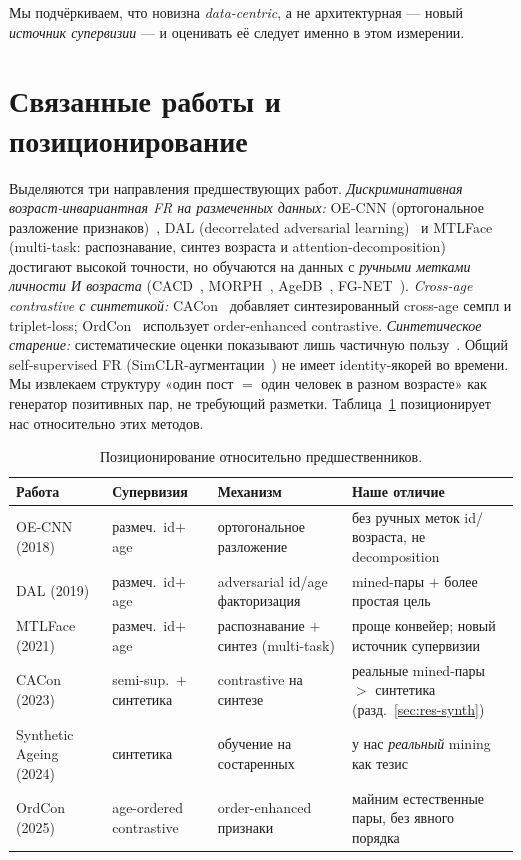 \documentclass[journal]{IEEEtran}
\begin{document}
Мы подчёркиваем, что новизна \emph{data-centric}, а не архитектурная --- новый \emph{источник супервизии} --- и оценивать её следует именно в этом измерении.

\section{Связанные работы и позиционирование}\label{sec:related}
Выделяются три направления предшествующих работ. \emph{Дискриминативная возраст-инвариантная FR на размеченных данных:} OE-CNN (ортогональное разложение признаков)~\cite{wang2018oecnn}, DAL (decorrelated adversarial learning)~\cite{wang2019dal} и MTLFace (multi-task: распознавание, синтез возраста и attention-decomposition)~\cite{huang2021mtlface} достигают высокой точности, но обучаются на данных с \emph{ручными метками личности И возраста} (CACD~\cite{chen2014cacd}, MORPH~\cite{ricanek2006morph}, AgeDB~\cite{moschoglou2017agedb}, FG-NET~\cite{panis2016fgnet}). \emph{Cross-age contrastive с синтетикой:} CACon~\cite{wang2024cacon} добавляет синтезированный cross-age семпл и triplet-loss; OrdCon~\cite{wang2025ordcon} использует order-enhanced contrastive. \emph{Синтетическое старение:} систематические оценки показывают лишь частичную пользу~\cite{yao2024synthageing}. Общий self-supervised FR (SimCLR-аугментации~\cite{chen2020simclr}) не имеет identity-якорей во времени. Мы извлекаем структуру «один пост $=$ один человек в разном возрасте» как генератор позитивных пар, не требующий разметки. Таблица~\ref{tab:positioning} позиционирует нас относительно этих методов.

\begin{table}[!t]
\renewcommand{\arraystretch}{1.25}
\caption{Позиционирование относительно предшественников.}
\label{tab:positioning}
\centering
\footnotesize
\begin{tabular}{@{}p{}p{}p{}p{}@{}}
\toprule
Работа & Супервизия & Механизм & Наше отличие \\
\midrule
OE-CNN (2018)~\cite{wang2018oecnn} & размеч.\ id$+$age & ортогональное разложение & без ручных меток id/возраста, не decomposition \\
DAL (2019)~\cite{wang2019dal} & размеч.\ id$+$age & adversarial id/age факторизация & mined-пары $+$ более простая цель \\
MTLFace (2021)~\cite{huang2021mtlface} & размеч.\ id$+$age & распознавание $+$ синтез (multi-task) & проще конвейер; новый источник супервизии \\
CACon (2023)~\cite{wang2024cacon} & semi-sup.\ $+$ синтетика & contrastive на синтезе & реальные mined-пары $>$ синтетика (разд.~\ref{sec:res-synth}) \\
Synthetic Ageing (2024)~\cite{yao2024synthageing} & синтетика & обучение на состаренных & у нас \emph{реальный} mining как тезис \\
OrdCon (2025)~\cite{wang2025ordcon} & age-ordered contrastive & order-enhanced признаки & майним естественные пары, без явного порядка \\
\bottomrule
\end{tabular}
\end{table}
\end{document}
